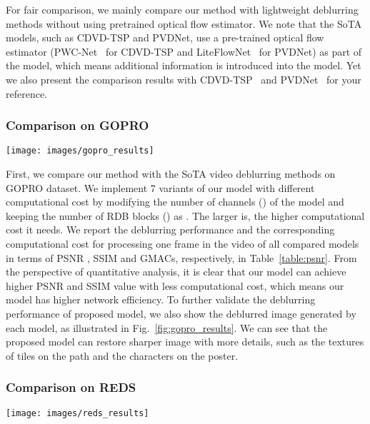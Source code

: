 \documentclass[twocolumn]{svjour3}          \smartqed  \usepackage{graphicx}
\begin{document}
For fair comparison, we mainly compare our method with lightweight deblurring methods without using pretrained optical flow estimator. We note that the SoTA models, such as CDVD-TSP and PVDNet, use a pre-trained optical flow estimator (PWC-Net~\cite{sun2018pwc} for CDVD-TSP and LiteFlowNet~\cite{hui2018liteflownet} for PVDNet) as part of the model, which means additional information is introduced into the model. Yet we also present the comparison results with CDVD-TSP~\cite{pan2020cascaded} and PVDNet~\cite{son2021recurrent} for your reference.

\subsubsection{Comparison on GOPRO}
\begin{figure*}[!t]
	\centering
	\texttt{[image: images/gopro\_results]}
	\caption{Visual comparisons on GOPRO~\cite{nah2017deep}.}
	\label{fig:gopro_results}
\end{figure*}

First, we compare our method with the SoTA video deblurring methods on GOPRO dataset. We implement 7 variants of our model with different computational cost by modifying the number of channels () of the model and keeping the number of RDB blocks () as . The larger  is, the higher computational cost it needs. We report the deblurring performance and the corresponding computational cost for processing one frame in the video of all compared models in terms of PSNR \cite{hore2010image}, SSIM and GMACs, respectively, in Table~\ref{table:psnr}. From the perspective of quantitative analysis, it is clear that our model can achieve higher PSNR and SSIM value with less computational cost, which means our model has higher network efficiency. To further validate the deblurring performance of proposed model, we also show the deblurred image generated by each model, as illustrated in Fig.~\ref{fig:gopro_results}. We can see that the proposed model can restore sharper image with more details, such as the textures of tiles on the path and the characters on the poster.

\subsubsection{Comparison on REDS}

\begin{figure*}[!t]
	\centering
	\texttt{[image: images/reds\_results]}
	\caption{Visual comparisons on REDS~\cite{nah2019ntire}.}
	\label{fig:reds_results}
\end{figure*}
\end{document}
